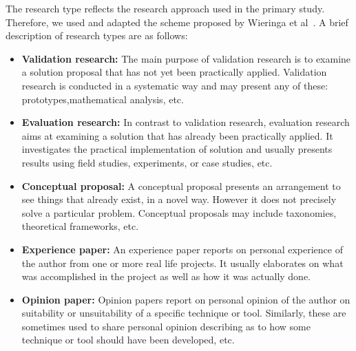 The research type reflects the research approach used in the primary study. Therefore, we used and adapted the scheme proposed by Wieringa et al~\cite{Wieringa:2005:REP:1107677.1107683}. A brief description of research types are as follows:
\begin{itemize}
 
\item \textbf{Validation research:} The main purpose of validation research is to examine a solution proposal that has not yet been practically applied. Validation research is conducted in a systematic way and may present any of these: prototypes,mathematical analysis, etc. 

\item \textbf{Evaluation research:} In contrast to validation research, evaluation research aims at examining a solution that has already been practically applied. It investigates the practical implementation of solution and usually presents results using field studies, experiments, or case studies, etc.

\item \textbf{Conceptual proposal:} A conceptual proposal presents an arrangement to see things that already exist, in a novel way. However it does not precisely solve a particular problem. Conceptual proposals may include taxonomies, theoretical frameworks, etc.

\item \textbf{Experience paper:} An experience paper reports on personal experience of the author from one or more real life projects. It usually elaborates on what was accomplished in the project as well as how it was actually done.

\item \textbf{Opinion paper:} Opinion papers report on personal opinion of the author on suitability or unsuitability of a specific technique or tool. Similarly, these are sometimes used to share personal opinion describing as to how some technique or tool should have been developed, etc.

\end{itemize}